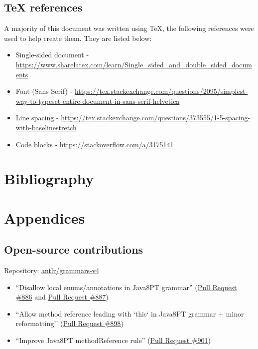 \documentclass[12pt, letterpaper]{article}
\begin{document}
\subsection{TeX references}
A majority of this document was written using TeX, the following references were used to help create them. They are listed below:

\begin{itemize}
  \item Single-sided document - \url{https://www.sharelatex.com/learn/Single_sided_and_double_sided_documents}
  \item Font (Sans Serif) - \url{https://tex.stackexchange.com/questions/2095/simplest-way-to-typeset-entire-document-in-sans-serif-helvetica}
  \item Line spacing - \url{https://tex.stackexchange.com/questions/373555/1-5-spacing-with-baselinestretch}
  \item Code blocks - \url{https://stackoverflow.com/a/3175141}
\end{itemize}

\section{Bibliography}
\printbibliography[heading=none]

\section{Appendices}

\subsection{Open-source contributions}
\label{apx:OpenSourceContributions}
Repository: \href{https://github.com/antlr/grammars-v4}{antlr/grammars-v4}
\begin{itemize}
  \item ``Disallow local enums/annotations in Java8PT grammar'' (\href{https://github.com/antlr/grammars-v4/pull/886}{Pull Request \#886} and \href{https://github.com/antlr/grammars-v4/pull/887}{Pull Request \#887})
  \item ``Allow method reference leading with `this` in Java8PT grammar + minor reformatting'' (\href{https://github.com/antlr/grammars-v4/pull/898}{Pull Request \#898})
  \item ``Improve Java8PT methodReference rule'' (\href{https://github.com/antlr/grammars-v4/pull/901}{Pull Request \#901})
\end{itemize}
\end{document}
